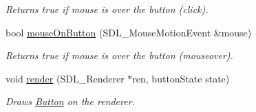 \begin{DoxyCompactItemize}
\begin{DoxyCompactList}\small\item\em Returns true if mouse is over the button (click). \end{DoxyCompactList}\item 
bool \hyperlink{class_button_a2b3d75341a6cc59a0a50730a977cd104}{mouse\+On\+Button} (S\+D\+L\+\_\+\+Mouse\+Motion\+Event \&mouse)\hypertarget{class_button_a2b3d75341a6cc59a0a50730a977cd104}{}\label{class_button_a2b3d75341a6cc59a0a50730a977cd104}

\begin{DoxyCompactList}\small\item\em Returns true if mouse is over the button (mouseover). \end{DoxyCompactList}\item 
void \hyperlink{class_button_a8afc12afd3beb237b7c17e7d00ce3a95}{render} (S\+D\+L\+\_\+\+Renderer $\ast$ren, button\+State state)\hypertarget{class_button_a8afc12afd3beb237b7c17e7d00ce3a95}{}\label{class_button_a8afc12afd3beb237b7c17e7d00ce3a95}

\begin{DoxyCompactList}\small\item\em Draws \hyperlink{class_button}{Button} on the renderer. \end{DoxyCompactList}\end{DoxyCompactItemize}
